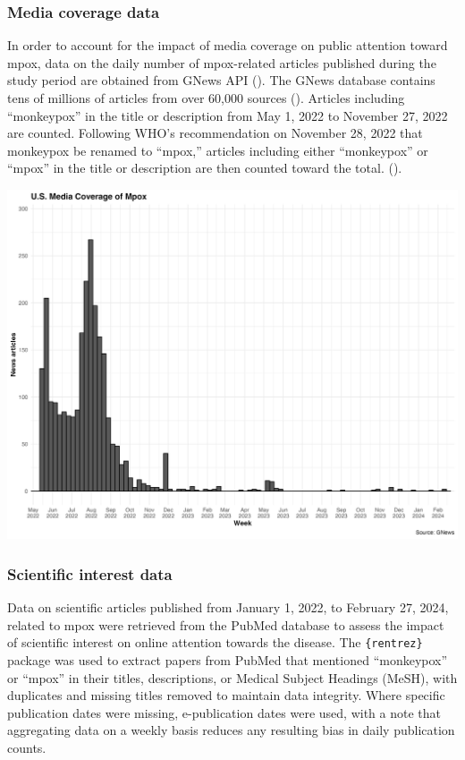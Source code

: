 \documentclass[
  12pt,
]{article}
\begin{document}
\subsubsection{Media coverage data}\label{media-coverage-data}

In order to account for the impact of media coverage on public attention
toward mpox, data on the daily number of mpox-related articles published
during the study period are obtained from GNews API
(). The GNews database contains tens of millions of articles
from over 60,000 sources (). Articles including
``monkeypox'' in the title or description from May 1, 2022 to November
27, 2022 are counted. Following WHO's recommendation on November 28,
2022 that monkeypox be renamed to ``mpox,'' articles including either
``monkeypox'' or ``mpox'' in the title or description are then counted
toward the total. ().

\includegraphics{images/mpox-news.png}\\

\subsubsection{Scientific interest data}\label{scientific-interest-data}

Data on scientific articles published from January 1, 2022, to February
27, 2024, related to mpox were retrieved from the PubMed database to
assess the impact of scientific interest on online attention towards the
disease. The \texttt{\{rentrez\}} package was used to extract papers
from PubMed that mentioned ``monkeypox'' or ``mpox'' in their titles,
descriptions, or Medical Subject Headings (MeSH), with duplicates and
missing titles removed to maintain data integrity. Where specific
publication dates were missing, e-publication dates were used, with a
note that aggregating data on a weekly basis reduces any resulting bias
in daily publication counts.
\end{document}
